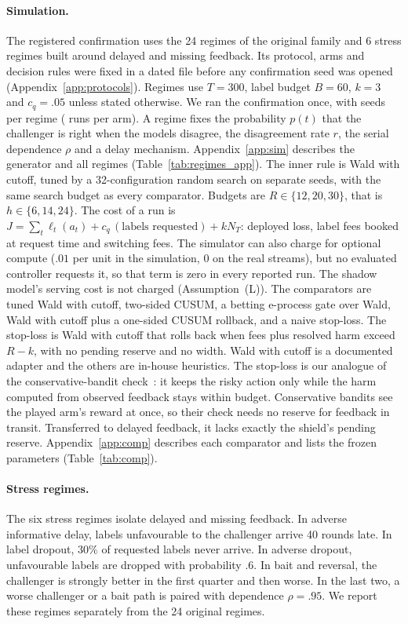 \documentclass[10pt]{article}
\theoremstyle{plain}
\theoremstyle{definition}
\begin{document}
\paragraph{Simulation.}
The registered confirmation uses the 24 regimes of the original family and 6 stress regimes built around delayed and missing feedback. Its protocol, arms and decision rules were fixed in a dated file before any confirmation seed was opened (Appendix~\ref{app:protocols}). Regimes use $T=300$, label budget $B=60$, $k=3$ and $c_q=.05$ unless stated otherwise. We ran the confirmation once, with \NSeedsPerRegime{} seeds per regime (\NRunsPerArm{} runs per arm). A regime fixes the probability $p(t)$ that the challenger is right when the models disagree, the disagreement rate $r$, the serial dependence $\rho$ and a delay mechanism. Appendix~\ref{app:sim} describes the generator and all \NRegimes{} regimes (Table~\ref{tab:regimes_app}).
The inner rule is Wald with cutoff, tuned by a 32-configuration random search on separate seeds, with the same search budget as every comparator. Budgets are $R\in\{12,20,30\}$, that is $h\in\{6,14,24\}$. The cost of a run is $J=\sum_t\ell_t(a_t)+c_q\,(\text{labels requested})+k N_T$: deployed loss, label fees booked at request time and switching fees. The simulator can also charge for optional compute ($.01$ per unit in the simulation, $0$ on the real streams), but no evaluated controller requests it, so that term is zero in every reported run. The shadow model's serving cost is not charged (Assumption~(L)).
The comparators are tuned Wald with cutoff, two-sided CUSUM, a betting e-process gate over Wald, Wald with cutoff plus a one-sided CUSUM rollback, and a naive stop-loss. The stop-loss is Wald with cutoff that rolls back when fees plus resolved harm exceed $R-k$, with no pending reserve and no width. Wald with cutoff is a documented adapter and the others are in-house heuristics. The stop-loss is our analogue of the conservative-bandit check~\citep{wu2016conservative}: it keeps the risky action only while the harm computed from observed feedback stays within budget. Conservative bandits see the played arm's reward at once, so their check needs no reserve for feedback in transit. Transferred to delayed feedback, it lacks exactly the shield's pending reserve. Appendix~\ref{app:comp} describes each comparator and lists the frozen parameters (Table~\ref{tab:comp}).

\paragraph{Stress regimes.}
The six stress regimes isolate delayed and missing feedback. In adverse informative delay, labels unfavourable to the challenger arrive 40 rounds late. In label dropout, $30\%$ of requested labels never arrive. In adverse dropout, unfavourable labels are dropped with probability $.6$. In bait and reversal, the challenger is strongly better in the first quarter and then worse. In the last two, a worse challenger or a bait path is paired with dependence $\rho=.95$. We report these regimes separately from the 24 original regimes.
\end{document}
